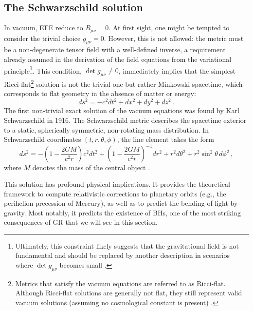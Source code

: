 \subsection{The Schwarzschild solution}
\label{Schwarzschild solution}


In vacuum, EFE reduce to $R_{\mu\nu} = 0$. At first sight, one might be tempted to consider the trivial choice $g_{\mu\nu}=0$. However, this is not allowed: the metric must be a non-degenerate tensor field with a well-defined inverse, a requirement already assumed in the derivation of the field equations from the variational principle\footnote{Ultimately, this constraint likely suggests that the gravitational field is not fundamental and should be replaced by another description in scenarios where $\det g_{\mu\nu}$ becomes small \cite{llibretongGR}.}. This condition, $\det g_{\mu\nu} \neq 0$, immediately implies that the simplest Ricci-flat\footnote{Metrics that satisfy the vacuum equations are referred to as Ricci-flat. Although Ricci-flat solutions are generally not flat, they still represent valid vacuum solutions (assuming no cosmological constant is present) \cite{LlibreBertJanssen}.} solution is not the trivial one but rather Minkowski spacetime, which corresponds to flat geometry in the absence of matter or energy:
\begin{equation}
    ds^2 = -c^2 dt^2 + dx^2 + dy^2 + dz^2 \ .
\end{equation}
The first non-trivial exact solution of the vacuum equations was found by Karl Schwarzschild in 1916. The Schwarzschild metric describes the spacetime exterior to a static, spherically symmetric, non-rotating mass distribution. In Schwarzschild coordinates $(t, r, \theta, \phi)$, the line element takes the form
\begin{equation}
ds^2 = -\left(1 - \frac{2GM}{c^2 r}\right) c^2 dt^2
+ \left(1 - \frac{2GM}{c^2 r}\right)^{-1} dr^2
+ r^2 d\theta^2 + r^2 \sin^2\theta \, d\phi^2 \, ,
\label{exteriorSchwarz}
\end{equation}
where $M$ denotes the mass of the central object \cite{Llibre_Peter_Collier_unacosadificildecomprender}.

This solution has profound physical implications. It provides the theoretical framework to compute relativistic corrections to planetary orbits (e.g., the perihelion precession of Mercury), as well as to predict the bending of light by gravity. Most notably, it predicts the existence of BHs, one of the most striking consequences of GR that we will see in this section.

